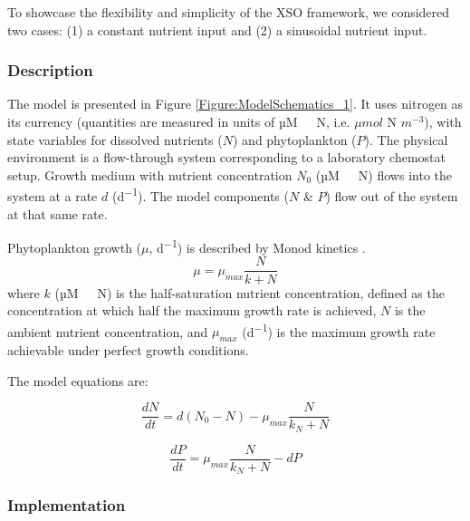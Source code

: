 \documentclass[journal abbreviation, manuscript]{copernicus}
\begin{document}
To showcase the flexibility and simplicity of the XSO framework, we considered two cases: (1) a constant nutrient input and (2) a sinusoidal nutrient input.

\subsubsection{Description}
The model is presented in Figure \ref{Figure:ModelSchematics_1}. It uses nitrogen as its currency (quantities are measured in units of \unit{µM \ N}, i.e. $\mu mol$ N $m^{-3}$), with state variables for dissolved nutrients ($N$) and phytoplankton ($P$). The physical environment is a flow-through system corresponding to a laboratory chemostat setup. Growth medium with nutrient concentration $N_0$ (\unit{µM \ N}) flows into the system at a rate $d$ (\unit{d^{-1}}). The model components ($N$ \& $P$) flow out of the system at that same rate.

Phytoplankton growth ($\mu$, \unit{d^{-1}}) is described by Monod kinetics \citep{Monod1942RecherchesBacteriennes}.
\begin{equation}
    \mu = \mu_{max} \frac{N}{k + N} 
\end{equation}
where $k$ (\unit{µM \ N}) is the half-saturation nutrient concentration, defined as the concentration at which half the maximum growth rate is achieved, $N$ is the ambient nutrient concentration, and $\mu_{max}$ (\unit{d^{-1}}) is the maximum growth rate achievable under perfect growth conditions.

The model equations are:

\begin{equation}
    \frac{d N}{d t} = 
    d (N_0 - N) %
    -  \mu_{max} \frac{N}{k_N + N} 
\end{equation}

\begin{equation}
    \frac{d P}{d t} =
    \mu_{max} \frac{N}{k_N + N} 
    - d P
\end{equation}



\subsubsection{Implementation}
\end{document}
